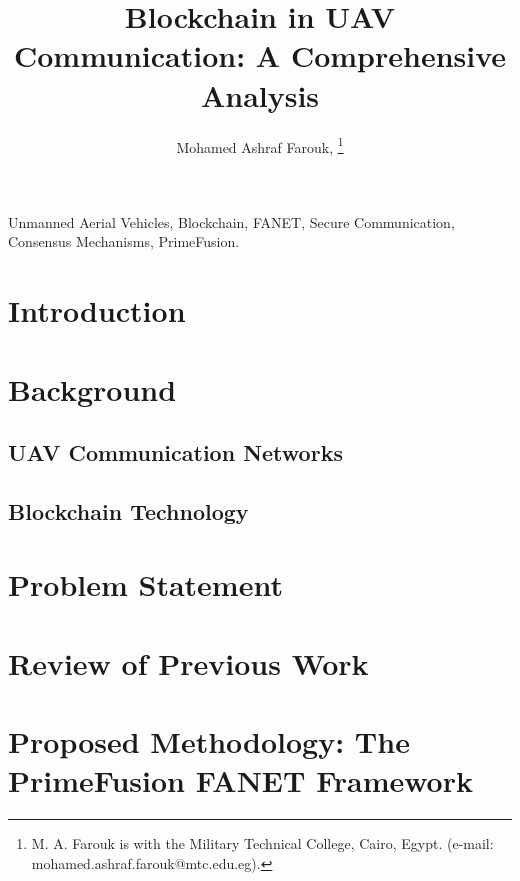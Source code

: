 \documentclass[journal]{IEEEtran}
\begin{document}
\title{Blockchain in UAV Communication: A Comprehensive Analysis}

\author{Mohamed Ashraf Farouk, 
\thanks{M. A. Farouk is with the Military Technical College, Cairo, Egypt.
(e-mail: mohamed.ashraf.farouk@mtc.edu.eg).}} %

\maketitle

\begin{abstract}
\end{abstract}

\begin{IEEEkeywords}
Unmanned Aerial Vehicles, Blockchain, FANET, Secure Communication, Consensus Mechanisms, PrimeFusion.
\end{IEEEkeywords}

\section{Introduction}
\label{sec:introduction}

\section{Background}
\label{sec:background}
\subsection{UAV Communication Networks}
\subsection{Blockchain Technology}

\section{Problem Statement}
\label{sec:problem_statement}

\section{Review of Previous Work}
\label{sec:literature_review}

\section{Proposed Methodology: The PrimeFusion FANET Framework}
\label{sec:methodology}
\end{document}
